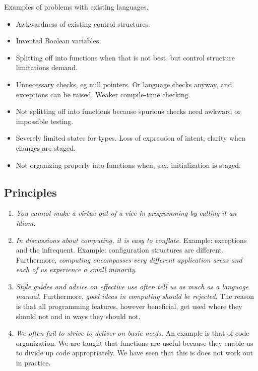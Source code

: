 \documentclass[10pt]{amsart}
\begin{document}
Examples of problems with existing languages.
\begin{itemize}
\item Awkwardness of existing control structures.
\item Invented Boolean variables.
\item Splitting off into functions when that is not best, but control
  structure limitations demand.
\item Unnecessary checks, eg null pointers.  Or language checks
  anyway, and exceptions can be raised.  Weaker compile-time checking.
\item Not splitting off into functions because spurious checks need
  awkward or impossible testing.
\item Severely limited states for types.  Loss of expression of
  intent, clarity when changes are staged.
\item Not organizing properly into functions when, say, initialization
  is staged.
\end{itemize}

\subsection{Principles}


\begin{enumerate}
\item \emph{You cannot make a virtue out of a vice in programming by
    calling it an idiom.}
\item \emph{In discussions about computing, it is easy to conflate.}
  Example: exceptions and the infrequent.  Example: configuration
  structures are different.  Furthermore, \emph{computing encompasses
    very different application areas and each of us experience a small
    minority}.
\item \emph{Style guides and advice on effective use often tell us as
    much as a language manual.}  Furthermore, \emph{good ideas in
    computing should be rejected}.  The reason is that all programming
  features, however beneficial, get used where they should not and in
  ways they should not.
\item \emph{We often fail to strive to deliver on basic needs.}  An
  example is that of code organization.  We are taught that functions
  are useful because they enable us to divide up code appropriately.
  We have seen that this is does not work out in practice.
\end{enumerate}
\end{document}
